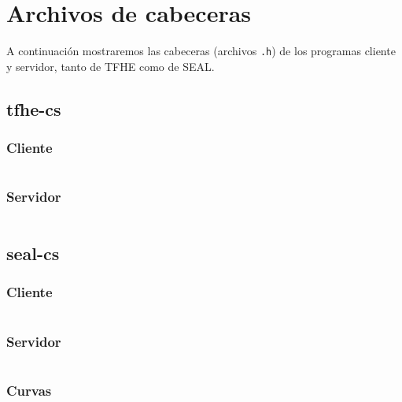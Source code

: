 \chapter{Archivos de cabeceras}
\label{appendix:cs-headers}

A continuación mostraremos las cabeceras (archivos \verb|.h|) de los programas cliente y servidor, tanto de TFHE como de SEAL.

\section{tfhe-cs}

\subsection{Cliente}

\inputminted{c++}{apendices/tfhe-cs/client.h}

\subsection{Servidor}

\inputminted{c++}{apendices/tfhe-cs/server.h}

\section{seal-cs}

\subsection{Cliente}

\inputminted{c++}{apendices/seal-cs/client.h}

\subsection{Servidor}

\inputminted{c++}{apendices/seal-cs/server.h}

\subsection{Curvas}

\inputminted{c++}{apendices/seal-cs/curva.h}
